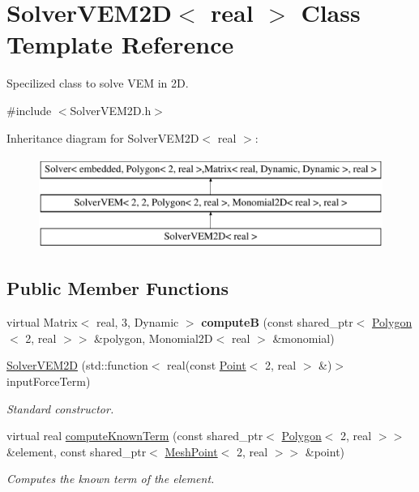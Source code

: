 \hypertarget{class_solver_v_e_m2_d}{\section{\-Solver\-V\-E\-M2\-D$<$ real $>$ \-Class \-Template \-Reference}
\label{class_solver_v_e_m2_d}
}


\-Specilized class to solve \-V\-E\-M in 2\-D.  




{\ttfamily \#include $<$\-Solver\-V\-E\-M2\-D.\-h$>$}

\-Inheritance diagram for \-Solver\-V\-E\-M2\-D$<$ real $>$\-:\begin{figure}[H]
\begin{center}
\leavevmode
\includegraphics[height=3.000000cm]{class_solver_v_e_m2_d}
\end{center}
\end{figure}
\subsection*{\-Public \-Member \-Functions}
\begin{DoxyCompactItemize}
\item 
\hypertarget{class_solver_v_e_m2_d_a047d81b5eda82278be3a2f835dce8845}{virtual \-Matrix$<$ real, 3, \-Dynamic $>$ {\bfseries compute\-B} (const shared\-\_\-ptr$<$ \hyperlink{class_polygon}{\-Polygon}$<$ 2, real $>$$>$ \&polygon, \-Monomial2\-D$<$ real $>$ \&monomial)}\label{class_solver_v_e_m2_d_a047d81b5eda82278be3a2f835dce8845}

\item 
\hypertarget{class_solver_v_e_m2_d_aaf184f7a8c8d71699aa94cf9f2816e47}{\hyperlink{class_solver_v_e_m2_d_aaf184f7a8c8d71699aa94cf9f2816e47}{\-Solver\-V\-E\-M2\-D} (std\-::function$<$ real(const \hyperlink{class_point}{\-Point}$<$ 2, real $>$ \&)$>$ input\-Force\-Term)}\label{class_solver_v_e_m2_d_aaf184f7a8c8d71699aa94cf9f2816e47}

\begin{DoxyCompactList}\small\item\em \-Standard constructor. \end{DoxyCompactList}\item 
virtual real \hyperlink{class_solver_v_e_m2_d_a718d3ee9a896d30ee4cbe8a63adf5605}{compute\-Known\-Term} (const shared\-\_\-ptr$<$ \hyperlink{class_polygon}{\-Polygon}$<$ 2, real $>$$>$ \&element, const shared\-\_\-ptr$<$ \hyperlink{class_mesh_point}{\-Mesh\-Point}$<$ 2, real $>$$>$ \&point)
\begin{DoxyCompactList}\small\item\em \-Computes the known term of the element. \end{DoxyCompactList}\end{DoxyCompactItemize}



